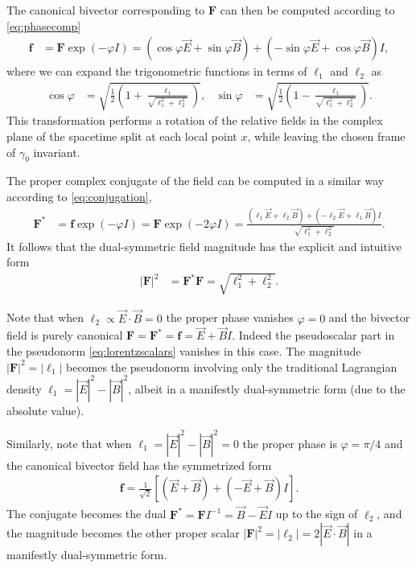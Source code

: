 \documentclass[1p,sort&compress]{elsarticle}
\numberwithin{equation}{section}
\newcommand{\rv}[1]{\vec{#1}}
\newcommand{\bv}[1]{\mathbf{#1}}
\begin{document}
The canonical bivector corresponding to $\bv{F}$ can then be computed according to \eqref{eq:phasecomp} 
\begin{align}
  \bv{f} &= \bv{F} \exp(-\varphi I) = (\cos\varphi \rv{E} + \sin\varphi \rv{B}) + (-\sin\varphi \rv{E} + \cos\varphi \rv{B})I,
\end{align}
where we can expand the trigonometric functions in terms of $\ell_1$ and $\ell_2$ as
\begin{align}
  \cos\varphi &= \sqrt{\frac{1}{2}\left(1 + \frac{\ell_1}{\sqrt{\ell_1^2 + \ell_2^2}}\right)}, &
  \sin\varphi &= \sqrt{\frac{1}{2}\left(1 - \frac{\ell_1}{\sqrt{\ell_1^2 + \ell_2^2}}\right)}.
\end{align}
This transformation performs a rotation of the relative fields in the complex plane of the spacetime split at each local point $x$, while leaving the chosen frame of $\gamma_0$ invariant.  

The proper complex conjugate of the field can be computed in a similar way according to \eqref{eq:conjugation}, 
\begin{align}
  \bv{F}^* &= \bv{f}\exp(-\varphi I) = \bv{F} \exp(-2\varphi I) = \frac{(\ell_1 \rv{E} + \ell_2 \rv{B}) + (-\ell_2 \rv{E} + \ell_1 \rv{B})I }{\sqrt{\ell_1^2 + \ell_2^2}}.
\end{align}
It follows that the dual-symmetric field magnitude has the explicit and intuitive form
\begin{align}\label{eq:magnitudelorentzscalars}
  |\bv{F}|^2 &= \bv{F}^* \bv{F} = \sqrt{\ell_1^2 + \ell_2^2}.
\end{align}

Note that when $\ell_2 \propto \rv{E}\cdot\rv{B} = 0$ the proper phase vanishes $\varphi = 0$ and the bivector field is purely canonical $\bv{F} = \bv{F}^* = \bv{f} = \rv{E} + \rv{B}I$.  Indeed the pseudoscalar part in the pseudonorm \eqref{eq:lorentzscalars} vanishes in this case.  The magnitude $|\bv{F}|^2 = |\ell_1|$ becomes the pseudonorm involving only the traditional Lagrangian density $\ell_1 = |\rv{E}|^2 - |\rv{B}|^2$, albeit in a manifestly dual-symmetric form (due to the absolute value).

Similarly, note that when $\ell_1 = |\rv{E}|^2 - |\rv{B}|^2 = 0$ the proper phase is $\varphi = \pi/4$ and the canonical bivector field has the symmetrized form 
\begin{align}
  \bv{f} = \frac{1}{\sqrt{2}}[(\rv{E} + \rv{B}) + (-\rv{E} + \rv{B})I].
\end{align}
The conjugate becomes the dual $\bv{F}^* = \bv{F} I^{-1} = \rv{B} - \rv{E}I$ up to the sign of $\ell_2$, and the magnitude becomes the other proper scalar $|\bv{F}|^2 = |\ell_2| = 2|\rv{E}\cdot\rv{B}|$ in a manifestly dual-symmetric form.
\end{document}

